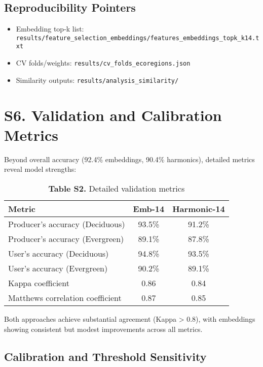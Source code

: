 \documentclass[utf8]{frontiers_suppmat}
\begin{document}
\subsection{Reproducibility Pointers}
\begin{itemize}
    \item Embedding top-k list: \texttt{results/feature\_selection\_embeddings/features\_embeddings\_topk\_k14.txt}
    \item CV folds/weights: \texttt{results/cv\_folds\_ecoregions.json}
    \item Similarity outputs: \texttt{results/analysis\_similarity/}
\end{itemize}

\section{S6. Validation and Calibration Metrics}

Beyond overall accuracy (92.4\% embeddings, 90.4\% harmonics), detailed metrics reveal model strengths:

\begin{table}[H]
    \centering
    \caption{\textbf{Table S2.} Detailed validation metrics}
    \begin{tabular}{lcc}
        \hline
        \textbf{Metric} & \textbf{Emb-14} & \textbf{Harmonic-14} \\
        \hline
        Producer's accuracy (Deciduous) & 93.5\% & 91.2\% \\
        Producer's accuracy (Evergreen) & 89.1\% & 87.8\% \\
        User's accuracy (Deciduous) & 94.8\% & 93.5\% \\
        User's accuracy (Evergreen) & 90.2\% & 89.1\% \\
        Kappa coefficient & 0.86 & 0.84 \\
        Matthews correlation coefficient & 0.87 & 0.85 \\
        \hline
    \end{tabular}
    \label{tab:validation_metrics}
\end{table}

Both approaches achieve substantial agreement (Kappa > 0.8), with embeddings showing consistent but modest improvements across all metrics.

\subsection{Calibration and Threshold Sensitivity}
\end{document}
